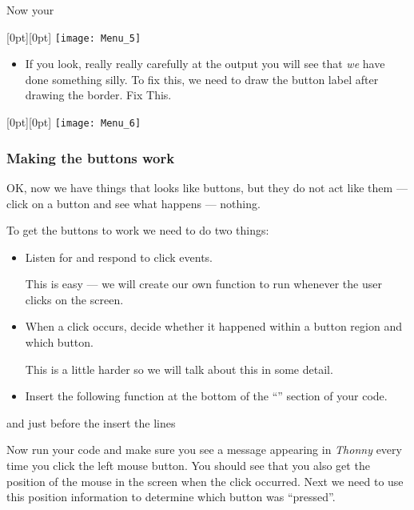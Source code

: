 \documentclass{coderdojo}
\newcommand\TODO[1]{
\begin{itemize}
\item[\todoSymbol] \color{todo} #1
\end{itemize}}
\begin{document}
Now your 

\mbox{}\hfill\raisebox{0.85cm}[0pt][0pt]{%
	\texttt{[image: Menu\_5]}
}\hspace*{-1.5cm}

\TODO{If you look, really really carefully at the output you will see that {\em we} have done something silly.  To fix this, we need to draw the button label after drawing the border. Fix This.}

\mbox{}\hfill\raisebox{0.85cm}[0pt][0pt]{%
	\texttt{[image: Menu\_6]}
}\hspace*{-1.5cm}


\subsubsection{Making the buttons work}

OK, now we have things that looks like buttons, but they do not act like them --- click on a button and see what happens --- nothing. 

To get the buttons to work we need to do two things:

\begin{itemize}
\item Listen for and respond to click events.

This is easy --- we will create our own  function to run whenever the user clicks on the screen.

\item When a click occurs, decide whether it happened within a button region and which button.

This is a little harder so we will talk about this in some detail.
\end{itemize}

\newpage

\TODO{Insert the following function at the bottom of the ``\code{Define helper functions}'' section of your code.}


and just before the  insert the lines


Now run your code and make sure you see a message appearing in {\em Thonny} every time you click the left mouse button. You should see that you also get the position of the mouse in the screen when the click occurred. Next we need to use this position information to determine which button was ``pressed''.
\end{document}
